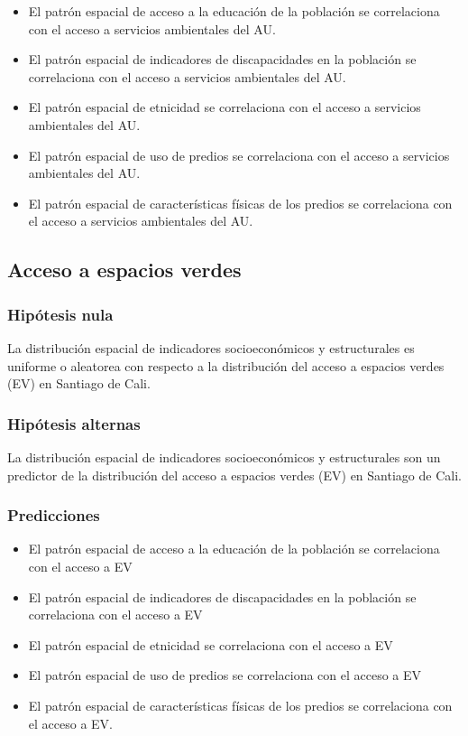 \documentclass[12pt,]{book}
\providecommand{\tightlist}{%
  \setlength{\itemsep}{0pt}\setlength{\parskip}{0pt}}
\begin{document}
\begin{itemize}
\tightlist
\item
  El patrón espacial de acceso a la educación de la población se
  correlaciona con el acceso a servicios ambientales del AU.
\item
  El patrón espacial de indicadores de discapacidades en la población se
  correlaciona con el acceso a servicios ambientales del AU.
\item
  El patrón espacial de etnicidad se correlaciona con el acceso a
  servicios ambientales del AU.
\item
  El patrón espacial de uso de predios se correlaciona con el acceso a
  servicios ambientales del AU.
\item
  El patrón espacial de características físicas de los predios se
  correlaciona con el acceso a servicios ambientales del AU.
\end{itemize}

\subsection{Acceso a espacios verdes}\label{acceso-a-espacios-verdes}

\subsubsection{Hipótesis nula}\label{hipotesis-nula-1}

La distribución espacial de indicadores socioeconómicos y estructurales
es uniforme o aleatorea con respecto a la distribución del acceso a
espacios verdes (EV) en Santiago de Cali.

\subsubsection{Hipótesis alternas}\label{hipotesis-alternas-1}

La distribución espacial de indicadores socioeconómicos y estructurales
son un predictor de la distribución del acceso a espacios verdes (EV) en
Santiago de Cali.

\subsubsection{Predicciones}\label{predicciones-1}

\begin{itemize}
\tightlist
\item
  El patrón espacial de acceso a la educación de la población se
  correlaciona con el acceso a EV
\item
  El patrón espacial de indicadores de discapacidades en la población se
  correlaciona con el acceso a EV
\item
  El patrón espacial de etnicidad se correlaciona con el acceso a EV
\item
  El patrón espacial de uso de predios se correlaciona con el acceso a
  EV
\item
  El patrón espacial de características físicas de los predios se
  correlaciona con el acceso a EV.
\end{itemize}
\end{document}

